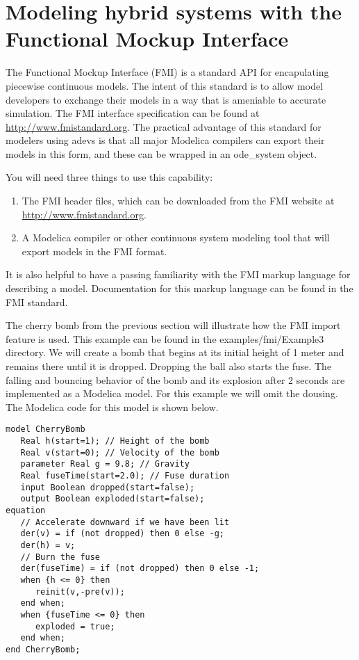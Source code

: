 \section{Modeling hybrid systems with the Functional Mockup Interface}
\label{sect:fmi}
The Functional Mockup Interface (FMI) is a standard API for encapulating piecewise continuous models. The intent of this standard is to allow model developers to exchange their models in a way that is ameniable to accurate simulation. The FMI interface specification can be found at \url{http://www.fmistandard.org}. The practical advantage of this standard for modelers using adevs is that all major Modelica compilers can export their models in this form, and these can be wrapped in an ode\_system object.

You will need three things to use this capability:
\begin{enumerate}
\item The FMI header files, which can be downloaded from the FMI website at \url{http://www.fmistandard.org}.
\item A Modelica compiler or other continuous system modeling tool that will export models in the FMI format.
\end{enumerate}
It is also helpful to have a passing familiarity with the FMI markup language for describing a model. Documentation for this markup language can be found in the FMI standard.

The cherry bomb from the previous section will illustrate how the FMI import feature is used. This example can be found in the examples/fmi/Example3 directory. We will create a bomb that begins at its initial height of 1 meter and remains there until it is dropped. Dropping the ball also starts the fuse. The falling and bouncing behavior of the bomb and its explosion after 2 seconds are implemented as a Modelica model. For this example we will omit the dousing. The Modelica code for this model is shown below.
\begin{verbatim}
model CherryBomb
   Real h(start=1); // Height of the bomb
   Real v(start=0); // Velocity of the bomb
   parameter Real g = 9.8; // Gravity
   Real fuseTime(start=2.0); // Fuse duration
   input Boolean dropped(start=false); 
   output Boolean exploded(start=false);
equation
   // Accelerate downward if we have been lit
   der(v) = if (not dropped) then 0 else -g;
   der(h) = v;
   // Burn the fuse
   der(fuseTime) = if (not dropped) then 0 else -1;
   when {h <= 0} then
      reinit(v,-pre(v));
   end when;
   when {fuseTime <= 0} then
      exploded = true;
   end when;
end CherryBomb;
\end{verbatim}

